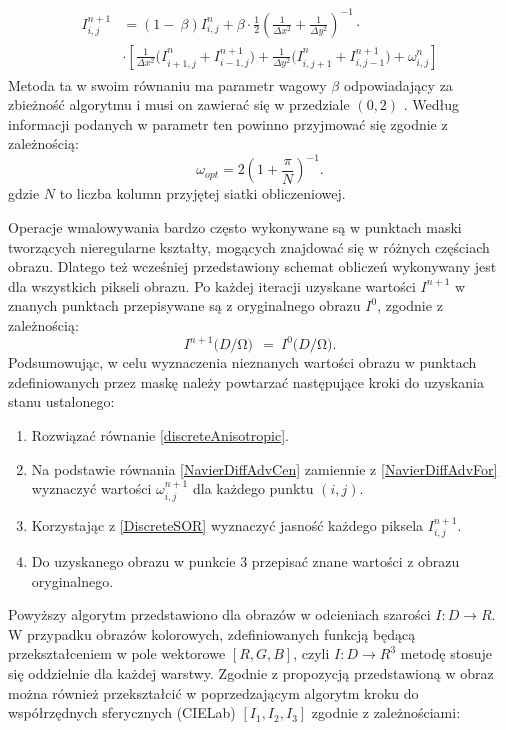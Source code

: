 \documentclass[a4paper,12pt,twoside,openany]{report}
\begin{document}
\begin{align}
\begin{aligned}
I^{n+1}_{i,j}
&= \left(1-\ \beta \right)I^n_{i,j}+\beta \cdot \frac{1}{2}{\left(\frac{1}{\Delta x^2}+\frac{1}{\Delta y^2}\right)}^{-1} \cdot \\[1ex]
&\cdot \left[\frac{1}{\Delta x^2}{(I}^n_{i+1,j}+I^{n+1}_{i-1,j})+\frac{1}{\Delta y^2}{(I}^n_{i,j+1}+I^{n+1}_{i,j-1})+{\omega }^n_{i,j}\right]
\end{aligned}
\label{DiscreteSOR}
\end{align}
Metoda ta w swoim równaniu ma parametr wagowy $\beta$ odpowiadający za zbieżność algorytmu i musi on zawierać się w przedziale $(0,2)$ \cite{neumann1981kahan}. Według informacji podanych w  \cite{blacksuccessive} parametr ten powinno przyjmować się zgodnie z zależnością:
\begin{equation}
{\omega }_{opt}=2{\left(1+\frac{\pi }{N}\right)}^{-1}
\label{BetaChoose}
.
\end{equation}
gdzie $N$ to liczba kolumn przyjętej siatki obliczeniowej. 
\par
Operacje wmalowywania bardzo często wykonywane są w punktach maski tworzących nieregularne kształty, mogących znajdować się w różnych częściach obrazu. Dlatego też wcześniej przedstawiony schemat obliczeń wykonywany jest dla wszystkich pikseli obrazu. Po każdej iteracji uzyskane wartości $I^{n+1}$ w znanych punktach przepisywane są z oryginalnego obrazu $I^{0}$, zgodnie z zależnością:
\begin{equation}
I^{n+1}(D/\mathrm{\Omega }\mathrm{)\ }\ ={\ I}^0(D/\mathrm{\Omega }\mathrm{)}.
\label{retrieveMask}
\end{equation}
Podsumowując, w celu wyznaczenia nieznanych wartości obrazu w punktach zdefiniowanych przez maskę należy powtarzać następujące kroki do uzyskania stanu ustalonego:
\begin{enumerate}
\item
Rozwiązać równanie \eqref{discreteAnisotropic}.
\item
Na podstawie równania \eqref{NavierDiffAdvCen} zamiennie z \eqref{NavierDiffAdvFor} wyznaczyć wartości $\omega_{i,j}^{n+1}$ dla każdego punktu $(i,j)$.
\item
Korzystając z \eqref{DiscreteSOR} wyznaczyć jasność każdego piksela $I_{i,j}^{n+1}$.
\item
Do uzyskanego obrazu w punkcie 3 przepisać znane wartości z obrazu oryginalnego.
\end{enumerate}
Powyższy algorytm przedstawiono dla obrazów w odcieniach szarości $I:D\to R$. W przypadku obrazów kolorowych, zdefiniowanych funkcją będącą przekształceniem w pole wektorowe $[R,G,B]$, czyli $I:D\to R^3$ metodę stosuje się oddzielnie dla każdej warstwy. Zgodnie z propozycją przedstawioną w \cite{fishelov2006image} obraz można również przekształcić w poprzedzającym algorytm kroku do współrzędnych sferycznych (CIELab) $\left[I_{1},I_{2},I_{3} \right]$ zgodnie z zależnościami:
\end{document}
